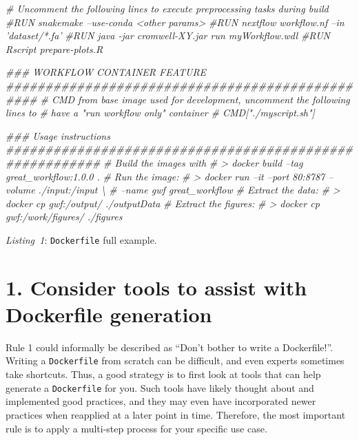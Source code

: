 \documentclass[10pt,letterpaper]{article}
\newenvironment{Shaded}{\begin{snugshade}}{\end{snugshade}}
\newcommand{\CommentTok}[1]{\textcolor[rgb]{0.56,0.35,0.01}{\textit{#1}}}
\begin{document}
\begin{Shaded}
\begin{Highlighting}[]
\CommentTok{# Uncomment the following lines to execute preprocessing tasks during build}
\CommentTok{#RUN snakemake --use-conda <other params>}
\CommentTok{#RUN nextflow workflow.nf --in 'dataset/*.fa'}
\CommentTok{#RUN java -jar cromwell-XY.jar run myWorkflow.wdl}
\CommentTok{#RUN Rscript prepare-plots.R}

\CommentTok{### WORKFLOW CONTAINER FEATURE ################################################}
\CommentTok{# CMD from base image used for development, uncomment the following lines to }
\CommentTok{# have a "run workflow only" container}
\CommentTok{# CMD["./myscript.sh"]}

\CommentTok{### Usage instructions ########################################################}
\CommentTok{# Build the images with}
\CommentTok{# > docker build --tag great_workflow:1.0.0 .}
\CommentTok{# Run the image:}
\CommentTok{# > docker run --it --port 80:8787 --volume ./input:/input \textbackslash{}}
\CommentTok{#     --name gwf great_workflow}
\CommentTok{# Extract the data:}
\CommentTok{# > docker cp gwf:/output/ ./outputData}
\CommentTok{# Extract the figures:}
\CommentTok{# > docker cp gwf:/work/figures/ ./figures}
\end{Highlighting}
\end{Shaded}

\normalsize

\emph{Listing~1}: \texttt{Dockerfile} full example.

\newpage

\hypertarget{consider-tools-to-assist-with-dockerfile-generation}{%
\section*{1. Consider tools to assist with Dockerfile
generation}\label{consider-tools-to-assist-with-dockerfile-generation}}

  \label{rule:tools} 

Rule 1 could informally be described as ``Don't bother to write a
Dockerfile!''. Writing a \texttt{Dockerfile} from scratch can be
difficult, and even experts sometimes take shortcuts. Thus, a good
strategy is to first look at tools that can help generate a
\texttt{Dockerfile} for you. Such tools have likely thought about and
implemented good practices, and they may even have incorporated newer
practices when reapplied at a later point in time. Therefore, the most
important rule is to apply a multi-step process for your specific use
case.
\end{document}
